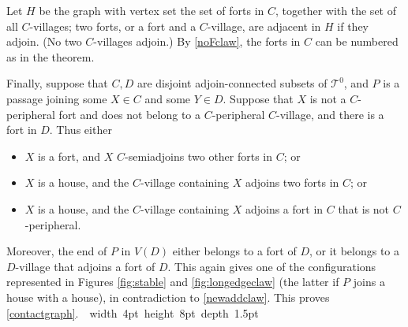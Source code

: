 \documentclass[titlepage,11pt]{article}
\newcommand\blackslug{\hbox{\hskip 1pt \vrule width 4pt height 8pt depth 1.5pt
		\hskip 1pt}}
\newcommand\bbox{\hfill \quad \blackslug \bigbreak}
\newcommand{\mac}{\mathcal}
\begin{document}
	Let $H$ be the graph with vertex set the set of forts in $C$, together with the set of all $C$-villages;
	two forts, or a fort and a $C$-village, are adjacent in $H$ if they adjoin. (No two $C$-villages adjoin.) 
	By \ref{noFclaw}, 
	the forts in $C$ can be numbered as in the theorem.
	
	Finally, suppose that $C,D$ are disjoint adjoin-connected subsets of $\mac T^0$, and $P$ is a passage joining some $X\in C$ and some  $Y\in D$.
	Suppose that $X$ is not a $C$-peripheral fort and does not belong to a $C$-peripheral $C$-village, and there is a fort in $D$. Thus either 
	\begin{itemize}
		\item $X$ is a fort, and $X$ $C$-semiadjoins two other forts in $C$; or
		\item $X$ is a house, and the $C$-village containing $X$ adjoins two forts in  $C$; or
		\item $X$ is a house, and the $C$-village containing $X$ adjoins a fort  in $C$ that is not $C$-peripheral.
	\end{itemize}
	Moreover, the end of $P$ in $V(D)$ either belongs to a fort of $D$, or it belongs to a $D$-village that adjoins 
	a fort of $D$. This again gives one of the configurations represented in Figures \ref{fig:stable} and \ref{fig:longedgeclaw}
	(the latter if $P$ joins a house with a house), in contradiction to \ref{newaddclaw}.
	This proves 
	\ref{contactgraph}.~\bbox
	
\end{document}

